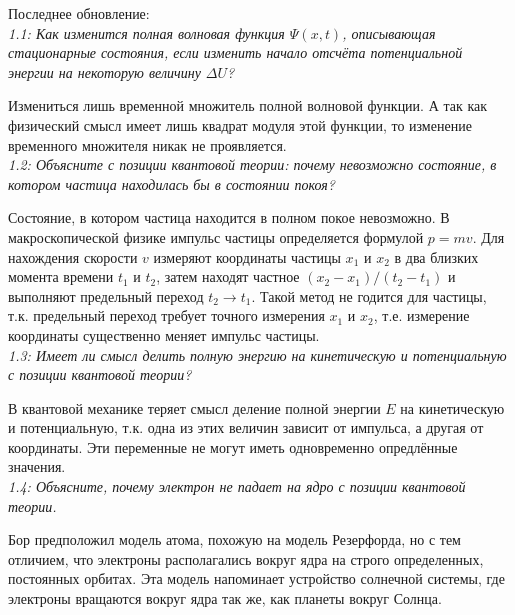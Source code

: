 





	Последнее обновление: %
    \\

	\emph{ 1.1: Как изменится полная волновая функция \( \Psi(x,t) \),
        описывающая стационарные состояния, если изменить начало отсчёта
        потенциальной энергии на некоторую величину \( \Delta U \)? }

		Измениться лишь временной множитель полной волновой функции. 
		А так как физический смысл имеет лишь квадрат модуля этой функции,
		то изменение временного множителя никак не проявляется. \\
	
    \emph{1.2: Объясните с позиции квантовой теории: почему невозможно 
    	состояние, в котором частица находилась бы в состоянии покоя?}

        Состояние, в котором частица находится в полном покое невозможно.
        В макроскопической физике импульс частицы определяется формулой
        \( p = mv \). Для нахождения скорости \( v \) измеряют 
        координаты частицы \( x_1 \) и \( x_2 \) в два близких момента
        времени \( t_1 \) и \( t_2 \), затем находят частное
        \( (x_2 - x_1)/(t_2 - t_1) \) и выполняют предельный переход
        \( t_2 \rightarrow t_1 \). Такой метод не годится для частицы, 
        т.к. предельный переход требует точного измерения \( x_1 \) и 
        \( x_2 \), т.е. измерение координаты существенно меняет импульс
        частицы. \\

    \emph{1.3: Имеет ли смысл делить полную энергию на кинетическую и 
        потенциальную с позиции квантовой теории?}

        В квантовой механике теряет смысл деление полной энергии \( E \)
        на кинетическую и потенциальную, т.к. одна из этих величин
        зависит от импульса, а другая от координаты. Эти переменные не 
        могут иметь одновременно опредлённые значения. \\

    \emph{1.4: Объясните, почему электрон не падает на ядро с позиции 
    	квантовой теории.}

        Бор предположил модель атома, похожую на модель Резерфорда, но 
        с тем отличием, что электроны располагались вокруг ядра 
        на строго определенных, постоянных орбитах. Эта модель 
        напоминает устройство солнечной системы, где электроны вращаются 
        вокруг ядра так же, как планеты вокруг Солнца. \\\\\\\\

